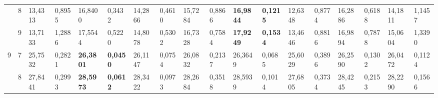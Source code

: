 \documentclass[conference]{IEEEtran}
\begin{document}
\begin{table*}[]
\begin{tabular}{|cc|ll|ll|ll|ll|ll|ll|ll|ll|}
		\multicolumn{1}{|c|}{}                    & 8          & \multicolumn{1}{l|}{13,4313}           & 0,8955                            & \multicolumn{1}{l|}{16,8400}           & 0,3432                            & \multicolumn{1}{l|}{14,2866}           & 0,4610                            & \multicolumn{1}{l|}{15,7284}           & 0,8866                            & \multicolumn{1}{l|}{\textbf{16,9844}}  & \textbf{0,1215}                   & \multicolumn{1}{l|}{12,6348}           & 0,8774                            & \multicolumn{1}{l|}{16,2886}           & 0,6188                            & \multicolumn{1}{l|}{14,1811}           & 1,1457                            \\ \cline{2-18} 
		\multicolumn{1}{|c|}{}                    & 9          & \multicolumn{1}{l|}{13,7133}           & 1,2886                            & \multicolumn{1}{l|}{17,5544}           & 0,5220                            & \multicolumn{1}{l|}{14,8078}           & 0,5302                            & \multicolumn{1}{l|}{16,7328}           & 0,7584                            & \multicolumn{1}{l|}{\textbf{17,9249}}  & \textbf{0,1534}                   & \multicolumn{1}{l|}{13,4646}           & 0,8816                            & \multicolumn{1}{l|}{16,9894}           & 0,7878                            & \multicolumn{1}{l|}{15,0604}           & 1,3390                            \\ \hline
		\multicolumn{1}{|c|}{\multirow{3}{*}{9}}  & 7          & \multicolumn{1}{l|}{25,7532}           & 0,2821                            & \multicolumn{1}{l|}{\textbf{26,3801}}  & \textbf{0,0450}                   & \multicolumn{1}{l|}{26,1147}           & 0,0754                            & \multicolumn{1}{l|}{26,0832}           & 0,2137                            & \multicolumn{1}{l|}{26,3649}           & 0,0685                            & \multicolumn{1}{l|}{25,6029}           & 0,3896                            & \multicolumn{1}{l|}{26,2590}           & 0,1302                            & \multicolumn{1}{l|}{26,0472}           & 0,1124                            \\ \cline{2-18} 
		\multicolumn{1}{|c|}{}                    & 8          & \multicolumn{1}{l|}{27,8441}           & 0,2993                            & \multicolumn{1}{l|}{\textbf{28,5973}}  & \textbf{0,0612}                   & \multicolumn{1}{l|}{28,3422}           & 0,0973                            & \multicolumn{1}{l|}{28,2684}           & 0,3518                            & \multicolumn{1}{l|}{28,5939}           & 0,1014                            & \multicolumn{1}{l|}{27,6805}           & 0,3734                            & \multicolumn{1}{l|}{28,4245}           & 0,2153                            & \multicolumn{1}{l|}{28,2290}           & 0,1566                            \\ \cline{2-18} 

\end{tabular}
\end{table*}
\end{document}
